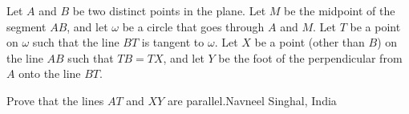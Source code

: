 Let $A$ and $B$ be two distinct points in the plane. Let $M$ be the midpoint of the segment $AB$,  and let $\omega$ be a circle that goes through $A$ and $M$. Let $T$ be a point on $\omega$ such that the line $BT$ is tangent to $\omega$. Let $X$ be a point (other than $B$) on the line $AB$ such that $TB = TX$,  and let $Y$ be the foot of the perpendicular from $A$ onto the line $BT$.

Prove that the lines $AT$ and $XY$ are parallel.Navneel Singhal, India